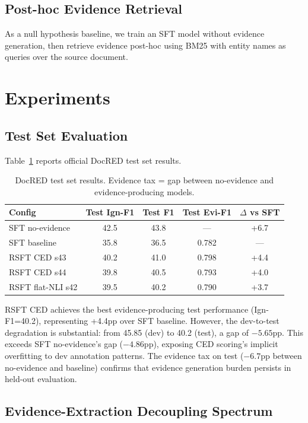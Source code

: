 \documentclass[11pt]{article}
\begin{document}
\subsection{Post-hoc Evidence Retrieval}

As a null hypothesis baseline, we train an SFT model without evidence generation, then retrieve evidence post-hoc using BM25 with entity names as queries over the source document.

\section{Experiments}

\subsection{Test Set Evaluation}
\label{sec:test}

Table~\ref{tab:test} reports official DocRED test set results.

\begin{table}[h]
\centering
\caption{DocRED test set results. Evidence tax = gap between no-evidence and evidence-producing models.}
\label{tab:test}
\begin{tabular}{lcccc}
\toprule
\textbf{Config} & \textbf{Test Ign-F1} & \textbf{Test F1} & \textbf{Test Evi-F1} & \textbf{$\Delta$ vs SFT} \\
\midrule
SFT no-evidence & 42.5 & 43.8 & --- & +6.7 \\
SFT baseline & 35.8 & 36.5 & 0.782 & --- \\
RSFT CED s43 & 40.2 & 41.0 & 0.798 & +4.4 \\
RSFT CED s44 & 39.8 & 40.5 & 0.793 & +4.0 \\
RSFT flat-NLI s42 & 39.5 & 40.2 & 0.790 & +3.7 \\
\bottomrule
\end{tabular}
\end{table}

RSFT CED achieves the best evidence-producing test performance (Ign-F1=40.2), representing +4.4pp over SFT baseline. However, the dev-to-test degradation is substantial: from 45.85 (dev) to 40.2 (test), a gap of $-5.65$pp. This exceeds SFT no-evidence's gap ($-4.86$pp), exposing CED scoring's implicit overfitting to dev annotation patterns. The evidence tax on test ($-6.7$pp between no-evidence and baseline) confirms that evidence generation burden persists in held-out evaluation.

\subsection{Evidence-Extraction Decoupling Spectrum}
\end{document}
